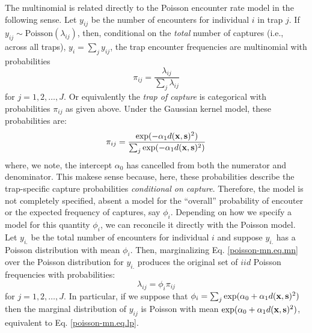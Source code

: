 The multinomial is related directly to the Poisson encounter rate
model in the following sense. Let $y_{ij}$ be the number of
encounters for individual $i$ in trap $j$. If $y_{ij} \sim
\mbox{Poisson}(\lambda_{ij})$,
then,
conditional on the {\it total}
number of captures (i.e., across all traps), $y_{i} = \sum_{j}
y_{ij}$, the trap encounter frequencies are multinomial with
probabilities
\[
 \pi_{ij} =  \frac{ \lambda_{ij} } { \sum_{j} \lambda_{ij} }
\]
for $j=1,2,\ldots,J$.
Or equivalently the {\it trap of
  capture} is categorical with probabilities $\pi_{ij}$ as given above.
Under the Gaussian kernel model, these probabilities are:
\begin{equation}
\pi_{ij} =  \frac{ \exp( - \alpha_{1}  d({\bf x},{\bf s})^2 ) }  {
   \sum_{j} \exp(-\alpha_{1} d({\bf x},{\bf s})^2)}
\label{poisson-mn.eq.mnprobs}
\end{equation}
where, we note, the intercept $\alpha_{0}$ has cancelled  from both the
numerator and denominator. This makese sense because, here, these
probabilities describe the trap-specific capture probabilities {\it
  conditional on capture}. 
Therefore, the model is not completely specified, absent a model for
the
``overall'' probability of encouter or the expected frequency of captures, say
$\phi_{i}$. Depending on how we specify a model for this quantity $\phi_{i}$, we can
reconcile it directly with the Poisson model.
Let $y_{i.}$ be the 
total number of encounters for individual $i$ and suppose $y_{i.}$ has
a Poisson distribution with mean $\phi_{i}$.
Then, marginalizing Eq. \ref{poisson-mn.eq.mn} over the Poisson
distribution for $y_{i.}$ produces the original set of $iid$ Poisson
frequencies with probabilities:
\[
 \lambda_{ij} = \phi_{i} \pi_{ij}
\]
for $j=1,2,\ldots,J$.
In particular, if we suppose that
$\phi_{i} = \sum_{j} \exp(\alpha_{0} + \alpha_{1} d({\bf x},{\bf s})^2)$
then the marginal distribution of $y_{ij}$ is Poisson with mean $\exp(
\alpha_{0} + \alpha_{1} d({\bf x},{\bf s})^2 )$, equivalent to
Eq. \ref{poisson-mn.eq.lp}.

